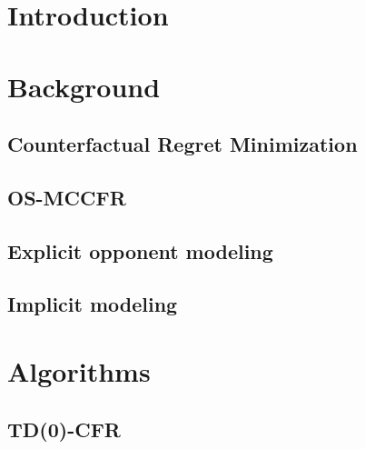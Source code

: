 \documentclass{aamas2013}
\begin{document}





\section{Introduction}

\section{Background}

    \subsection{Counterfactual Regret Minimization}

    \subsection{OS-MCCFR}
    
    \subsection{Explicit opponent modeling}
    
    \subsection{Implicit modeling}

\section{Algorithms}

    \subsection{TD(0)-CFR}
\end{document}
